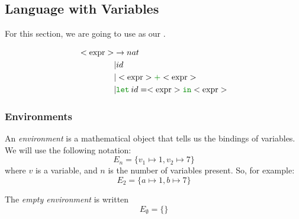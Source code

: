 \subsection{Language with Variables}\label{subsec:Language_with_Variables}
For this section, we are going to use  as our .
\begin{blackbox}
  \begin{equation}\label{eq:LetAdd_Grammar}
    \begin{aligned}
      \Nonterminal{expr} &\rightarrow nat \\
      &\vert id \\
      &\vert \Nonterminal{expr} \textcolor{Green4}{\mathtt{+}} \Nonterminal{expr} \\
      &\vert \textcolor{Green4}{\mathtt{let}}\: id = \Nonterminal{expr} \textcolor{Green4}{\mathtt{in}} \Nonterminal{expr} \\
    \end{aligned}
  \end{equation}
\end{blackbox}

\subsubsection{Environments}\label{subsubsec:Semantic_Environments}
\begin{definition}[Environment]\label{def:Semantic_Environment}
  An \emph{environment} is a mathematical object that tells us the bindings of variables.
  We will use the following notation:
  \begin{equation}\label{eq:Environment}
    E_{n} = \lbrace v_{1} \mapsto 1, v_{2} \mapsto 7 \rbrace
  \end{equation}
  where $v$ is a variable, and $n$ is the number of variables present.
  So, for example:
  \begin{equation*}
    E_{2} = \lbrace a \mapsto 1, b \mapsto 7 \rbrace
  \end{equation*}

  \begin{remark}\label{rmk:Empty_Environment}
    The \emph{empty environment} is written
    \begin{equation}\label{eq:Empty_Environment}
      E_{\emptyset} = \lbrace \rbrace
    \end{equation}
  \end{remark}
\end{definition}

